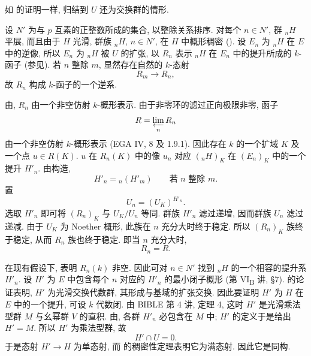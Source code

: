 


如 的证明一样,
归结到 \(U\) 还为交换群的情形.

设 \(N'\) 为与 \(p\) 互素的正整数所成的集合, 以整除关系排序.
对每个 \(n\in N'\), 群 \({}_nH\) 平展,
而且由于 \(H\) 光滑, 群族 \({}_nH\), \(n\in N'\),
在 \(H\) 中概形稠密 ().
设 \(E_n\) 为 \({}_nH\) 在 \(E\) 中的逆像, 所以 \(E_n\) 为 \({}_nH\) 被 \(U\) 的扩张,
以 \(R_n\) 表示 \({}_nH\) 在 \(E_n\) 中的提升所成的 \(k\)-函子
(参见).
若 \(n\) 整除 \(m\), 显然存在自然的 \(k\)-态射
\[
  R_m\longrightarrow R_n,
\]
故 \(R_n\) 构成 \(k\)-函子的一个逆系.

由,
\(R_n\) 由一个非空仿射 \(k\)-概形表示.
由于非零环的滤过正向极限非零, 函子
\[
  R=\varprojlim_n R_n
\]
由一个非空仿射 \(k\)-概形表示 (EGA IV, 8 及 1.9.1).
因此存在 \(k\) 的一个扩域 \(K\) 及一个点 \(u\in R(K)\).
\(u\) 在 \(R_n(K)\) 中的像 \(u_n\) 对应 \(({}_nH)_K\)
在 \((E_n)_K\) 中的一个提升 \(H'_n\). 由构造,
\[
  H'_n={}_n(H'_m)\qquad\text{若 \(n\) 整除 \(m\)}.
\]
置
\[
  U_n=(U_K)^{H'_n}.
\]
选取 \(H'_n\) 即可将 \((R_n)_K\) 与 \(U_K/U_n\) 等同.
群族 \(H'_n\) 滤过递增, 因而群族 \(U_n\) 滤过递减.
由于 \(U_K\) 为 Noether 概形, 此族在 \(n\) 充分大时终于稳定.
所以 \((R_n)_K\) 族终于稳定, 从而 \(R_n\) 族也终于稳定.
即当 \(n\) 充分大时,
\[
  R_n=R.
\]

在现有假设下,  表明 \(R_n(k)\) 非空.
因此可对 \(n\in N'\) 找到 \({}_nH\) 的一个相容的提升系 \(H'_n\).
设 \(H'\) 为 \(E\) 中包含每个 \(n\) 对应的 \(H'_n\) 的最小闭子概形
(第 VI\textsubscript{B} 讲, \S7).
 的论证表明,
\(H'\) 为光滑交换代数群, 其形成与基域的扩张交换.
因此要证明 \(H'\) 为 \(H\) 在 \(E\) 中的一个提升, 可设 \(k\) 代数闭.
由 BIBLE 第 4 讲, 定理 4, 这时 \(H'\) 是光滑乘法型群 \(M\) 与幺幂群 \(V\) 的直积.
由, 各群 \(H'_n\) 必包含在 \(M\) 中;
\(H'\) 的定义于是给出 \(H'=M\). 所以 \(H'\) 为乘法型群, 故
\[
  H'\cap U=0.
\]
于是态射 \(H'\to H\) 为单态射,
而 的稠密性定理表明它为满态射.
因此它是同构.

